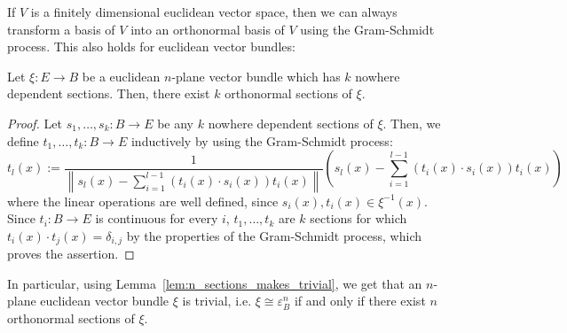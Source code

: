 If $V$ is a finitely dimensional euclidean vector space, then we can always transform a basis of $V$ into an orthonormal basis of $V$ using the Gram-Schmidt process. This also holds for euclidean vector bundles:
\begin{lemma}\label{lem:orthonormal_sections} Let $\xi:E\to B$ be a euclidean $n$-plane vector bundle which has $k$ nowhere dependent sections. Then, there exist $k$ orthonormal sections of $\xi$.
\end{lemma}
\begin{proof} Let $s_1,\ldots,s_k:B\to E$ be any $k$ nowhere dependent sections of $\xi$. Then, we define $t_1,\ldots,t_k:B\to E$ inductively by using the Gram-Schmidt process:
\[t_l(x):=\frac{1}{\left\|s_l(x)-\sum_{i=1}^{l-1}(t_i(x)\cdot s_i(x))t_i(x)\right\|}\left(s_l(x)-\sum_{i=1}^{l-1}(t_i(x)\cdot s_i(x))t_i(x)\right)\]
where the linear operations are well defined, since $s_i(x),t_i(x)\in\xi^{-1}(x)$. Since $t_i:B\to E$ is continuous for every $i$, $t_1,\ldots,t_k$ are $k$ sections for which $t_i(x)\cdot t_j(x)=\delta_{i,j}$ by the properties of the Gram-Schmidt process, which proves the assertion.
\end{proof}
\begin{remark}\label{rem:trivial_euclidian} In particular, using Lemma~\ref{lem:n_sections_makes_trivial}, we get that an $n$-plane euclidean vector bundle $\xi$ is trivial, i.e. $\xi\cong\varepsilon_B^n$ if and only if there exist $n$ orthonormal sections of $\xi$.
\end{remark}

